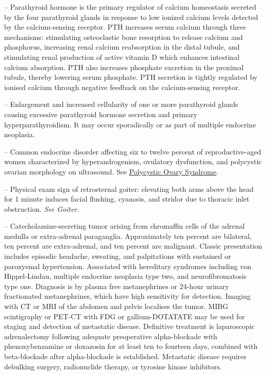 -- Parathyroid hormone is the primary regulator of calcium homeostasis secreted by the four parathyroid glands in response to low ionized calcium levels detected by the calcium-sensing receptor. PTH increases serum calcium through three mechanisms: stimulating osteoclastic bone resorption to release calcium and phosphorus, increasing renal calcium reabsorption in the distal tubule, and stimulating renal production of active vitamin D which enhances intestinal calcium absorption. PTH also increases phosphate excretion in the proximal tubule, thereby lowering serum phosphate. PTH secretion is tightly regulated by ionised calcium through negative feedback on the calcium-sensing receptor.

-- Enlargement and increased cellularity of one or more parathyroid glands causing excessive parathyroid hormone secretion and primary hyperparathyroidism. It may occur sporadically or as part of multiple endocrine neoplasia.

-- Common endocrine disorder affecting six to twelve percent of reproductive-aged women characterized by hyperandrogenism, ovulatory dysfunction, and polycystic ovarian morphology on ultrasound. See \hyperlink{Polycystic Ovary Syndrome}{Polycystic Ovary Syndrome}.

-- Physical exam sign of retrosternal goiter: elevating both arms above the head for 1 minute induces facial flushing, cyanosis, and stridor due to thoracic inlet obstruction. \textit{See Goiter.}

-- Catecholamine-secreting tumor arising from chromaffin cells of the adrenal medulla or extra-adrenal paraganglia. Approximately ten percent are bilateral, ten percent are extra-adrenal, and ten percent are malignant. Classic presentation includes episodic headache, sweating, and palpitations with sustained or paroxysmal hypertension. Associated with hereditary syndromes including von Hippel-Lindau, multiple endocrine neoplasia type two, and neurofibromatosis type one. Diagnosis is by plasma free metanephrines or 24-hour urinary fractionated metanephrines, which have high sensitivity for detection. Imaging with CT or MRI of the abdomen and pelvis localises the tumor. MIBG scintigraphy or PET-CT with FDG or gallium-DOTATATE may be used for staging and detection of metastatic disease. Definitive treatment is laparoscopic adrenalectomy following adequate preoperative alpha-blockade with phenoxybenzamine or doxazosin for at least ten to fourteen days, combined with beta-blockade after alpha-blockade is established. Metastatic disease requires debulking surgery, radionuclide therapy, or tyrosine kinase inhibitors.

